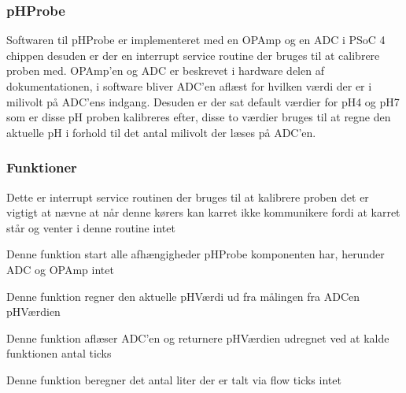 \subsubsection{pHProbe}
Softwaren til pHProbe er implementeret med en OPAmp og en ADC i PSoC 4 chippen desuden er der en interrupt service routine der bruges til at calibrere proben med. OPAmp'en og ADC er beskrevet i hardware delen af dokumentationen, i software bliver ADC'en aflæst for hvilken værdi der er i milivolt på ADC'ens indgang. Desuden er der sat default værdier for pH4 og pH7 som er disse pH proben kalibreres efter, disse to værdier bruges til at regne den aktuelle pH i forhold til det antal milivolt der læses på ADC'en.

\subsubsection{Funktioner}

{Dette er interrupt service routinen der bruges til at kalibrere proben det er vigtigt at nævne at når denne kørers kan karret ikke kommunikere fordi at karret står og venter i denne routine}
{intet}
{
}

{Denne funktion start alle afhængigheder pHProbe komponenten har, herunder ADC og OPAmp}
{intet}
{
}

{Denne funktion regner den aktuelle pHVærdi ud fra målingen fra ADCen}
{pHVærdien}
{
}

{Denne funktion aflæser ADC'en og returnere pHVærdien udregnet ved at kalde  funktionen}
{antal ticks}
{
}

{Denne funktion beregner det antal liter der er talt via flow ticks}
{intet}
{
}